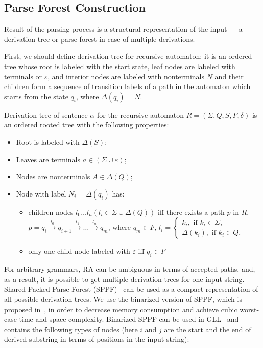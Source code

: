 \documentclass[runningheads,a4paper]{llncs}
\begin{document}
\subsection{Parse Forest Construction}

Result of the parsing process is a structural representation of the input --- a derivation tree or parse forest in case of multiple derivations.

First, we should define derivation tree for recursive automaton: it is an ordered tree whose root is labeled with the start state,
leaf nodes are labeled with terminals or $\varepsilon$, and interior nodes are labeled with  nonterminals $N$ and their children form a sequence of transition labels of a path in the
automaton which starts from the state $q_i$, where $ \Delta(q_i) = N $.

\begin{mydef}

Derivation tree of sentence $\alpha$ for the recursive automaton $R=(\Sigma, Q, S, F, \delta)$ is an ordered rooted tree with the following properties:

\begin{itemize}
    \item Root is labeled with $\Delta(S)$;
    \item Leaves are terminals $a\in (\Sigma \cup \varepsilon)$;
    \item Nodes are nonterminals $A\in \Delta(Q)$;
    \item Node with label $N_i = \Delta(q_i)$ has:
    \begin{itemize}
        \item 
            children nodes $l_0 \dots l_n (l_i \in \Sigma \cup \Delta(Q))$ iff there exists a
            path $p$ in $R$, $p = q_i \xrightarrow[]{l_0} q_{i+1} \xrightarrow[]{l_1} \dots \xrightarrow{l_n} q_m$, where
            $q_m \in F$, $l_i = 
            \left\{
            \begin{matrix}
            k_i, \text{ if }  k_i \in \Sigma,\\
            \Delta(k_i), \text{ if } k_i \in Q,
            \end{matrix}
            \right.
            $
        \item only one child node labeled with $\varepsilon$ iff $ q_i \in F $
    \end{itemize}
\end{itemize}
\end{mydef}

For arbitrary grammars, RA can be ambiguous in terms of accepted paths, and, as a result, it is possible to get multiple derivation trees for one input string.
Shared Packed Parse Forest (SPPF)~\cite{SPPF} can be used as a compact representation of all possible derivation trees.
We use the binarized version of SPPF, which is proposed in~\cite{brnglr}, in order to decrease memory consumption and achieve cubic worst-case time and space complexity.
Binarized SPPF can be used in GLL~\cite{scott2013gll} and contains the following types of nodes (here $i$ and $j$ are the start and the end of derived substring in terms of positions in the input string):
\end{document}

